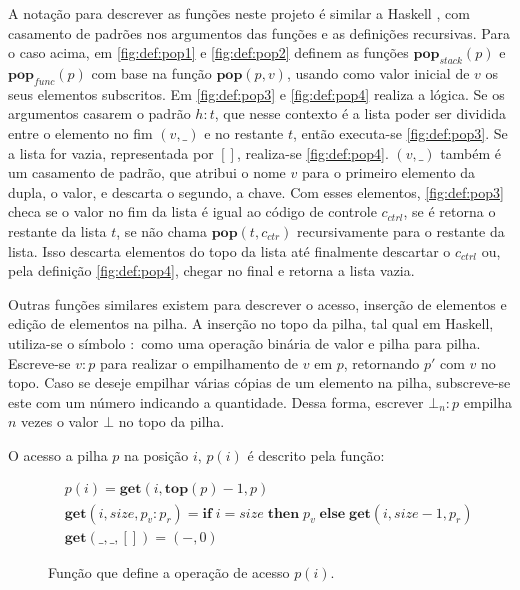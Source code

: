 A notação para descrever as funções neste projeto é similar a Haskell \cite{HASKELL}, com casamento de padrões nos argumentos das funções e as definições recursivas. Para o caso acima, em \ref{fig:def:pop1} e \ref{fig:def:pop2} definem as funções $\mathbf{pop}_{stack}(p)$ e $\mathbf{pop}_{func}(p)$ com base na função $\mathbf{pop}(p, v)$, usando como valor inicial de $v$ os seus elementos subscritos. Em \ref{fig:def:pop3} e \ref{fig:def:pop4} realiza a lógica. Se os argumentos casarem o padrão $h : t$, que nesse contexto é a lista poder ser dividida entre o elemento no fim $(v, \_)$ e no restante $t$, então executa-se \ref{fig:def:pop3}. Se a lista for vazia, representada por $[]$, realiza-se \ref{fig:def:pop4}. $(v,\_)$ também é um casamento de padrão, que atribui o nome $v$ para o primeiro elemento da dupla, o valor, e descarta o segundo, a chave. Com esses elementos, \ref{fig:def:pop3} checa se o valor no fim da lista é igual ao código de controle $c_{ctrl}$, se é retorna o restante da lista $t$, se não chama $\mathbf{pop}(t, c_{ctr})$ recursivamente para o restante da lista. Isso descarta elementos do topo da lista até finalmente descartar o $c_{ctrl}$ ou, pela definição \ref{fig:def:pop4}, chegar no final e retorna a lista vazia.

Outras funções similares existem para descrever o acesso, inserção de elementos e edição de elementos na pilha. A inserção no topo da pilha, tal qual em Haskell, utiliza-se o símbolo $:$ como uma operação binária de valor e pilha para pilha. Escreve-se $v : p$ para realizar o empilhamento de $v$ em $p$, retornando $p'$ com $v$ no topo. Caso se deseje empilhar várias cópias de um elemento na pilha, subscreve-se este com um número indicando a quantidade. Dessa forma, escrever $\bot_n : p$ empilha $n$ vezes o valor $\bot$ no topo da pilha. 

O acesso a pilha $p$ na posição $i$, $p(i)$ é descrito pela função:

\begin{figure}[ht]
	\begin{align}
	&p(i) = \mathbf{get}(i, \mathbf{top}(p) - 1, p) \label{fig:def:px1}\\
	&\mathbf{get}(i, size, p_v : p_r) = \mathbf{if}\;i = size \;\mathbf{then}\;p_v\;\mathbf{else}\;\mathbf{get}(i, size - 1, p_r) \label{fig:def:px2}\\
	&\mathbf{get}(\_, \_, []) = (-,0) \label{fig:def:px3}
	\end{align}
	\caption{Função que define a operação de acesso $p(i)$.}
	\label{fig:def:px}
\end{figure}

